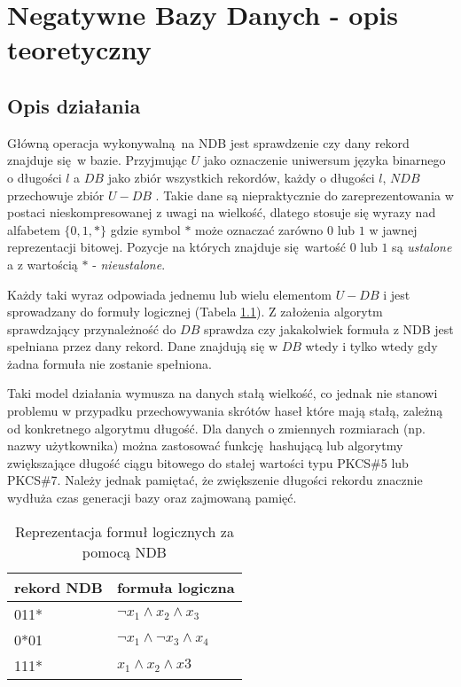 \chapter{Negatywne Bazy Danych - opis teoretyczny}
\section{Opis działania}
Główną operacja wykonywalną na NDB jest sprawdzenie czy dany rekord znajduje się w bazie. Przyjmując $U$ 
jako oznaczenie uniwersum języka binarnego o długości $l$ a $DB$ jako zbiór wszystkich rekordów, każdy o długości $l$,
$NDB$ przechowuje zbiór $U - DB$ \cite{NRI-Esponda}. Takie dane są niepraktycznie do zareprezentowania w postaci nieskompresowanej z uwagi na wielkość, dlatego
stosuje się wyrazy nad alfabetem $\{0,1,*\}$ gdzie symbol $*$ może oznaczać zarówno $0$ lub $1$ w jawnej reprezentacji bitowej.
Pozycje na których znajduje się wartość $0$ lub $1$ są \textit{ustalone} a z wartością $*$ - \textit{nieustalone}.

Każdy taki wyraz odpowiada jednemu lub wielu elementom $U - DB$ i jest sprowadzany do formuły logicznej (Tabela \ref{Tbl:NDB-logform}).
Z założenia algorytm sprawdzający przynależność do $DB$ sprawdza czy jakakolwiek formuła z NDB jest spełniana przez dany rekord. 
Dane znajdują się w $DB$ wtedy i tylko wtedy gdy żadna formuła nie zostanie spełniona. 

Taki model działania wymusza na danych stałą wielkość,
co jednak nie stanowi problemu w przypadku przechowywania skrótów haseł które mają stałą, zależną od konkretnego algorytmu długość.
Dla danych o zmiennych rozmiarach (np. nazwy użytkownika) można zastosować funkcję hashującą lub algorytmy zwiększające długość ciągu bitowego do stałej wartości typu PKCS\#5 lub PKCS\#7.
Należy jednak pamiętać, że zwiększenie długości rekordu znacznie wydłuża czas generacji bazy oraz zajmowaną pamięć. 

\begin{table}[h]
    \caption{Reprezentacja formuł logicznych za pomocą NDB}
    \centering
    \label{Tbl:NDB-logform}
    \begin{tabular}{|l|l|}
        \hline
        rekord NDB & formuła logiczna                       \\ \hline
        011*       & $\neg{x_1} \land x_2 \land x_3$        \\ \hline
        0*01       & $\neg{x_1} \land \neg{x_3} \land x_4 $ \\ \hline
        111*       & $x_1 \land x_2 \land x3$               \\ \hline
    \end{tabular}
\end{table}

